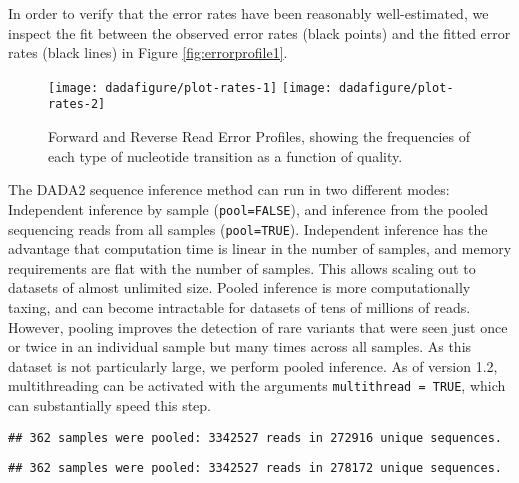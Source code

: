 In order to verify that the error rates have been reasonably
well-estimated, we inspect the fit between the observed error rates (black
points) and the fitted error rates (black lines) in Figure \ref{fig:errorprofile1}.

\begin{knitrout}
\color{fgcolor}\begin{kframe}
\begin{alltt}
\end{alltt}
\end{kframe}
\end{knitrout}
\begin{figure}
\texttt{[image: dadafigure/plot-rates-1]}
\texttt{[image: dadafigure/plot-rates-2]}
\caption{Forward and Reverse Read Error Profiles, showing the
  frequencies of each type of nucleotide transition as a function of quality.}\label{fig:r
  errorprofile1}
\end{figure}

The DADA2 sequence inference method can run in two different modes:
Independent inference by sample ({\tt pool=FALSE}), and inference from the
pooled sequencing reads from all samples ({\tt pool=TRUE}). Independent
inference has the advantage that computation time is linear
in the number of samples, and memory requirements are flat with the
number of samples. This allows scaling out to datasets of almost unlimited
size. Pooled inference is more computationally taxing, and can become
intractable for datasets of tens of millions of reads.
However, pooling improves the detection of rare variants that
were seen just once or twice in an individual sample but many times across
all samples. As this dataset is not particularly large, we perform pooled
inference. 
As of version 1.2, multithreading can be activated with the arguments 
{\tt multithread = TRUE}, which can substantially speed this step.

\begin{knitrout}
\color{fgcolor}\begin{kframe}
\begin{alltt}
 \hlkwb{<-}  \hlstd{=ddF[[}\hlstd{]]}\hlopt{$} \hlstd{=}\hlstd{)}
\end{alltt}
\begin{verbatim}
## 362 samples were pooled: 3342527 reads in 272916 unique sequences.
\end{verbatim}
\begin{alltt}
 \hlkwb{<-}  \hlstd{=ddR[[}\hlstd{]]}\hlopt{$} \hlstd{=}\hlstd{)}
\end{alltt}
\begin{verbatim}
## 362 samples were pooled: 3342527 reads in 278172 unique sequences.
\end{verbatim}
\end{kframe}
\end{knitrout}

